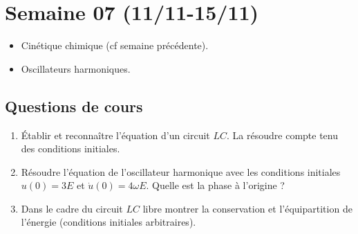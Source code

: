 \section{Semaine 07 (11/11-15/11) }


\begin{itemize}
	\item Cinétique chimique (cf semaine précédente).
	\item Oscillateurs harmoniques.
\end{itemize}

\subsection{Questions de cours}

\begin{enumerate}
	\item Établir et reconnaître l'équation d'un circuit $LC$. La résoudre compte tenu des conditions initiales.
	\item Résoudre l'équation de l'oscillateur harmonique avec les conditions initiales $u(0)=3E$ et $\dot{u}(0)=4 \omega E$. Quelle est la phase à l'origine ?
	\item Dans le cadre du circuit $LC$ libre montrer la conservation et l'équipartition de l'énergie (conditions initiales arbitraires).
\end{enumerate}


